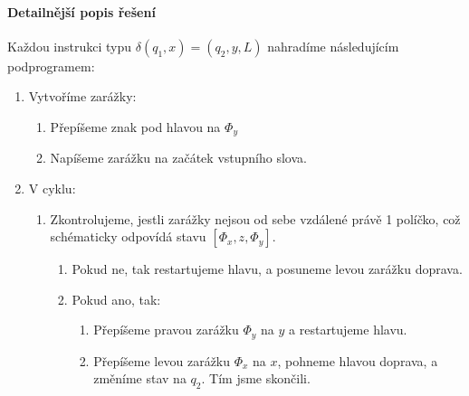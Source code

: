 \documentclass{article}
\begin{document}

\paragraph{Detailnější popis řešení}
Každou instrukci typu $\delta(q_1, x) = (q_2, y, L)$ nahradíme následujícím
podprogramem:
\begin{enumerate}
  \item Vytvoříme zarážky:
  \begin{enumerate}
    \item Přepíšeme znak pod hlavou na $\Phi_y$
    \item Napíšeme zarážku na začátek vstupního slova.
  \end{enumerate}
  \item V cyklu:
  \begin{enumerate}
    \item Zkontrolujeme, jestli zarážky nejsou od sebe vzdálené právě 1 políčko,
    což schématicky odpovídá stavu $[\Phi_x, z, \Phi_y]$.
    \begin{enumerate}
      \item Pokud ne, tak restartujeme hlavu, a posuneme levou zarážku doprava.
      \item Pokud ano, tak:
      \begin{enumerate}
        \item Přepíšeme pravou zarážku $\Phi_y$ na $y$ a restartujeme hlavu.
        \item Přepíšeme levou zarážku $\Phi_x$ na $x$, pohneme hlavou doprava,
        a změníme stav na $q_2$. Tím jsme skončili.
      \end{enumerate}
    \end{enumerate}
  \end{enumerate}
\end{enumerate}
\end{document}
